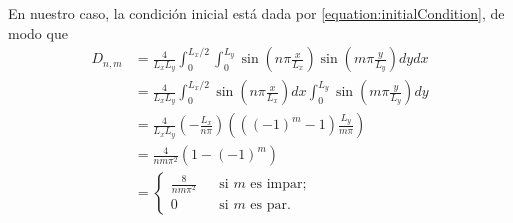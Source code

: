\documentclass{article}
\begin{document}
    En nuestro caso, la condición inicial está dada por \eqref{equation:initialCondition}, de modo que
    \begin{align}
      D_{n, m}
      &=
      \frac{4}{L_x L_y}
      \int_0^{L_x / 2}
        \int_0^{L_y}
          \sin\left( n \pi \frac{x}{L_x} \right)
          \sin\left( m \pi \frac{y}{L_y} \right)
        d y
      d x
      \\
      &=
      \frac{4}{L_x L_y}
      \int_0^{L_x / 2}
        \sin\left( n \pi \frac{x}{L_x} \right)
      d x
        \int_0^{L_y}
          \sin\left( m \pi \frac{y}{L_y} \right)
      d y
      \\
      &=
      \frac{4}{L_x L_y}
      \left( - \frac{L_x}{n \pi} \right)
      \left( ((- 1)^m - 1) \frac{L_y}{m \pi} \right)
      \\
      &=
      \frac{4}{n m \pi^2}
      (1 - (- 1)^m)
      \\
      &=
      \left\{
        \begin{aligned}
          \frac{8}{n m \pi^2}
            &&\text{si } m \text{ es impar;}
          \\
          0
            &&\text{si } m \text{ es par.}
        \end{aligned}
      \right.
    \end{align}
\end{document}
